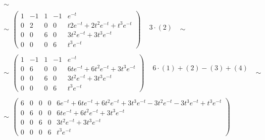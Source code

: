 \begin{equation*}
\begin{array}{l}
 \sim\\
\sim
 \begin{array}{ll}
  \left(\begin{array}{cccc|c}
    1 & -1 & 1 & -1 & e^{-t}\\
    0 & 2 & 0 & 0 & t 2e^{-t} + 2t^2 e^{-t} + t^3 e^{-t}\\
    0 & 0 & 6 & 0 & 3t^2 e^{-t} + 3t^3 e^{-t}\\
    0 & 0 & 0 & 6 & t^3 e^{-t}
   \end{array}
  \right) & 
  \begin{array}{l}
    ~\\
    3\cdot(2)\\
    ~\\
    ~
  \end{array}
 \end{array}
\sim\\
\sim
 \begin{array}{ll}
  \left(\begin{array}{cccc|c}
    1 & -1 & 1 & -1 & e^{-t}\\
    0 & 6 & 0 & 0 & 6te^{-t} + 6t^2 e^{-t} + 3t^3 e^{-t}\\
    0 & 0 & 6 & 0 & 3t^2 e^{-t} + 3t^3 e^{-t}\\
    0 & 0 & 0 & 6 & t^3 e^{-t}
   \end{array}
  \right) & 
  \begin{array}{l}
    6\cdot(1) + (2) - (3) + (4)\\
    ~\\
    ~\\
    ~
  \end{array}
 \end{array}
\sim\\
\sim
 \begin{array}{ll}
  \left(\begin{array}{cccc|c}
    6 & 0 & 0 & 0 & 6e^{-t} + 6t e^{-t} + 6t^2 e^{-t} + 3t^3 e^{-t} - 3t^2 e^{-t} - 3t^3 e^{-t} + t^3 e^{-t}\\
    0 & 6 & 0 & 0 & 6te^{-t} + 6t^2 e^{-t} + 3t^3 e^{-t}\\
    0 & 0 & 6 & 0 & 3t^2 e^{-t} + 3t^3 e^{-t}\\
    0 & 0 & 0 & 6 & t^3 e^{-t}
   \end{array}
  \right) & 
  \begin{array}{l}
    ~\\
    ~\\

\end{array}
\end{array}
\end{array}
\end{equation*}
